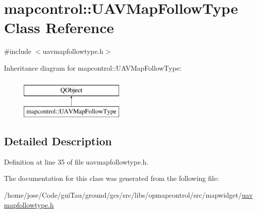 \hypertarget{classmapcontrol_1_1_u_a_v_map_follow_type}{\section{mapcontrol\-:\-:U\-A\-V\-Map\-Follow\-Type Class Reference}
\label{classmapcontrol_1_1_u_a_v_map_follow_type}
}


{\ttfamily \#include $<$uavmapfollowtype.\-h$>$}

Inheritance diagram for mapcontrol\-:\-:U\-A\-V\-Map\-Follow\-Type\-:\begin{figure}[H]
\begin{center}
\leavevmode
\includegraphics[height=2.000000cm]{classmapcontrol_1_1_u_a_v_map_follow_type}
\end{center}
\end{figure}


\subsection{Detailed Description}


Definition at line 35 of file uavmapfollowtype.\-h.



The documentation for this class was generated from the following file\-:\begin{DoxyCompactItemize}
\item 
/home/jose/\-Code/gui\-Tau/ground/gcs/src/libs/opmapcontrol/src/mapwidget/\hyperlink{uavmapfollowtype_8h}{uavmapfollowtype.\-h}\end{DoxyCompactItemize}
